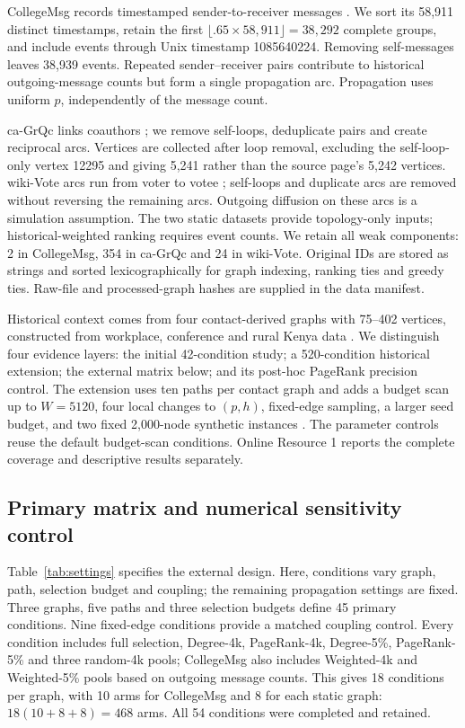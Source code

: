 \documentclass[smallextended]{svjour3}
\begin{document}
CollegeMsg records timestamped sender-to-receiver messages \cite{college}. We sort its 58,911 distinct timestamps, retain the first $\lfloor .65\times58,911\rfloor=38,292$ complete groups, and include events through Unix timestamp 1085640224. Removing self-messages leaves 38,939 events. Repeated sender--receiver pairs contribute to historical outgoing-message counts but form a single propagation arc. Propagation uses uniform $p$, independently of the message count.

ca-GrQc links coauthors \cite{grqc}; we remove self-loops, deduplicate pairs and create reciprocal arcs. Vertices are collected after loop removal, excluding the self-loop-only vertex 12295 and giving 5,241 rather than the source page's 5,242 vertices. wiki-Vote arcs run from voter to votee \cite{signed,links}; self-loops and duplicate arcs are removed without reversing the remaining arcs. Outgoing diffusion on these arcs is a simulation assumption. The two static datasets provide topology-only inputs; historical-weighted ranking requires event counts. We retain all weak components: 2 in CollegeMsg, 354 in ca-GrQc and 24 in wiki-Vote. Original IDs are stored as strings and sorted lexicographically for graph indexing, ranking ties and greedy ties. Raw-file and processed-graph hashes are supplied in the data manifest.

Historical context comes from four contact-derived graphs with 75--402 vertices, constructed from workplace, conference and rural Kenya data \cite{ref3,ref4,ref5,ref6}. We distinguish four evidence layers: the initial 42-condition study; a 520-condition historical extension; the external matrix below; and its post-hoc PageRank precision control. The extension uses ten paths per contact graph and adds a budget scan up to $W=5120$, four local changes to $(p,h)$, fixed-edge sampling, a larger seed budget, and two fixed 2,000-node synthetic instances \cite{ref17,ref18}. The parameter controls reuse the default budget-scan conditions. Online Resource 1 reports the complete coverage and descriptive results separately.

\subsection{Primary matrix and numerical sensitivity control}
Table~\ref{tab:settings} specifies the external design. Here, conditions vary graph, path, selection budget and coupling; the remaining propagation settings are fixed. Three graphs, five paths and three selection budgets define 45 primary conditions. Nine fixed-edge conditions provide a matched coupling control. Every condition includes full selection, Degree-4k, PageRank-4k, Degree-5\%, PageRank-5\% and three random-4k pools; CollegeMsg also includes Weighted-4k and Weighted-5\% pools based on outgoing message counts. This gives 18 conditions per graph, with 10 arms for CollegeMsg and 8 for each static graph: $18(10+8+8)=468$ arms. All 54 conditions were completed and retained.
\end{document}
